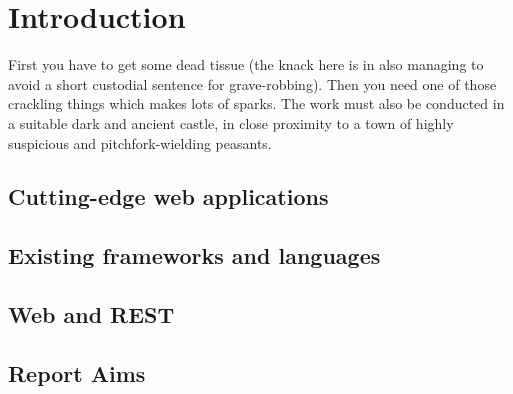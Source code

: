 
\chapter{Introduction}

First you have to get some dead tissue (the knack here is in also managing to
avoid a short custodial sentence for grave-robbing). Then you need one of
those crackling things which makes lots of sparks. The work must also be
conducted in a suitable dark and ancient castle, in close proximity to a town
of highly suspicious and pitchfork-wielding peasants.

\section{Cutting-edge web applications}

\section{Existing frameworks and languages}

\section{Web and REST}

\section{Report Aims}
